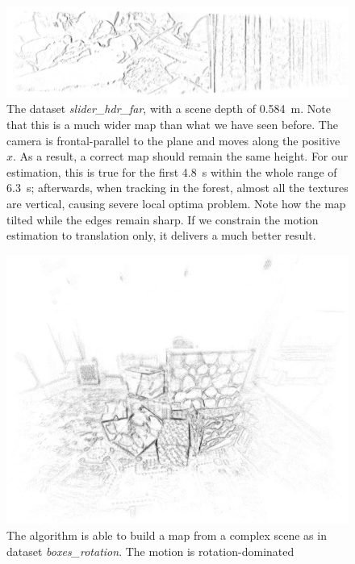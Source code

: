   \begin{figure}
    \centering
    \includegraphics[width=\textwidth]{images/slider_hdr_far_map_45.jpg}
    \caption{The dataset \textit{slider\_hdr\_far}, with a scene depth
      of \SI{0.584}{\meter}. Note that this is a much wider map than
      what we have seen before. The camera is frontal-parallel to the
      plane and moves along the positive $x$. As a result, a correct
      map should remain the same height. For our estimation, this is
      true for the first \SI{4.8}{\second} within the whole range of
      \SI{6.3}{\second}; afterwards, when tracking in the forest,
      almost all the textures are vertical, causing severe local
      optima problem. Note how the map tilted while the edges remain
      sharp. If we constrain the motion estimation to translation
      only, it delivers a much better result.}
    \label{fig:slider_hdr_far_map}
  \end{figure}
  \begin{figure}
    \centering
    \includegraphics[width=\textwidth]{images/boxes_rotation_map.jpg}
    \caption{The algorithm is able to build a map from a complex scene
      as in dataset \textit{boxes\_rotation}. The motion is
      rotation-dominated}
    \label{fig:boxes_rotation_map}
  \end{figure}


